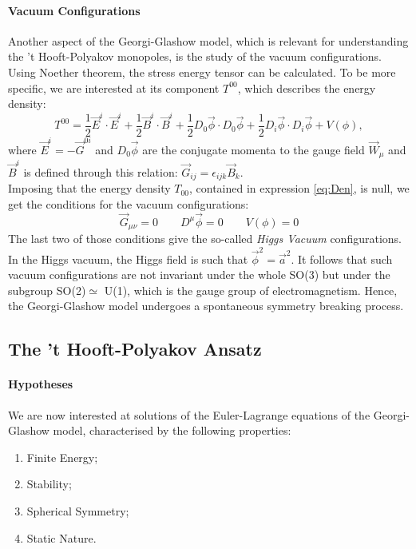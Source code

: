 \paragraph{Vacuum Configurations}Another aspect of the Georgi-Glashow model, which is relevant for understanding the 't Hooft-Polyakov monopoles, is the study of the vacuum configurations.\\
Using Noether theorem, the stress energy tensor can be calculated. To be more specific, we are interested at its component $T^{00}$, which describes the energy density: 
\begin{equation}
T^{00} = \frac{1}{2} \Vec{E}^i \cdot  \Vec{E}^i + \frac{1}{2} \Vec{B}^i \cdot \Vec{B}^i +\frac{1}{2} D_0 \Vec{\phi} \cdot D_0 \Vec{\phi} +\frac{1}{2} D_i \Vec{\phi} \cdot  D_i \Vec{\phi} + V(\phi),
\label{eq:Den}
\end{equation}
where $\Vec{E}^i = - \Vec{G}^{0i}$ and $D_0 \Vec{\phi}$ are the conjugate momenta to the gauge field $\Vec{W}_{\mu}$ and $\Vec{B}^i$ is defined through this relation: $ \Vec{G}_{ij} = \epsilon_{ijk} \Vec{B}_k$.\\
Imposing that the energy density $T_{00}$, contained in expression \ref{eq:Den}, is null, we get the conditions for the vacuum configurations: 
\begin{equation}
\Vec{G}_{\mu \nu} = 0 \qquad D^{\mu} \Vec{\phi}  = 0 \qquad V(\phi)=0
\end{equation}
The last two of those conditions give the so-called \textit{Higgs Vacuum} configurations. 
In the Higgs vacuum, the Higgs field is such that $\vec{\phi}^2 = \vec{a}^2$. It follows that such vacuum configurations are not invariant under the whole SO(3) but under the subgroup SO(2)$\simeq$ U(1), which is the gauge group of electromagnetism. Hence, the Georgi-Glashow model undergoes a spontaneous symmetry breaking process.

\subsection{The 't Hooft-Polyakov Ansatz}
\label{sect:Ansatz}
 \paragraph{Hypotheses}We are now interested at solutions of the Euler-Lagrange equations of the Georgi-Glashow model, characterised by the following properties: 
 \begin{enumerate}
     \item Finite Energy; 
     \item Stability; 
     \item Spherical Symmetry;
     \item Static Nature.
 \end{enumerate}
 
